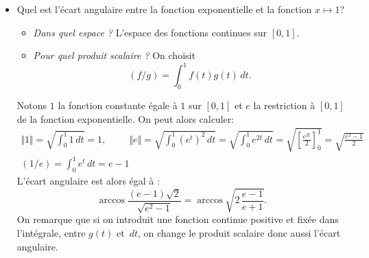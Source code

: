 \begin{exples}
\begin{itemize}
\item Quel est l'écart angulaire entre la fonction exponentielle et la fonction $x \mapsto 1$?
\begin{itemize}
\item \emph{Dans quel espace ?} L'espace des fonctions continues sur $[0,1]$.
\item \emph{Pour quel produit scalaire ?} On choisit
\begin{displaymath}
(f/g) = \int_{0}^{1} f(t) g(t) \,dt.
\end{displaymath}
\end{itemize}
Notons $1$ la fonction constante égale à $1$ sur $[0,1]$ et $e$ la restriction à $[0,1]$ de la fonction exponentielle. On peut alors calculer:
\begin{multline*}
 \Vert 1 \Vert  = \sqrt{ \int_{0}^{1} 1 \,dt } = 1, \hspace{1cm}
 \Vert e \Vert  = \sqrt{ \int_{0}^{1} (e^{t})^2 \,dt } = \sqrt{ \int_{0}^{1} e^{2t} \,dt } = \sqrt{ \left[ \frac{e^{2t}}{2} \right]_{0}^{1} } = \sqrt{ \frac{e^2 - 1}{2} }\\
 (1 / e) = \int_{0}^{1} e^{t} \, dt = e - 1
\end{multline*}
L'écart angulaire est alors égal à :
\begin{displaymath}
\displaystyle \arccos \frac{ (e - 1) \sqrt{2} }{ \sqrt{ e^2 - 1 } } = \arccos \sqrt{2 \, \frac{e - 1}{e + 1}}.
\end{displaymath}
On remarque que si on introduit une fonction continue positive et fixée dans l'intégrale, entre $g(t)$ et $\, dt$, on change le produit scalaire donc aussi l'écart angulaire.
\end{itemize}
\end{exples}


